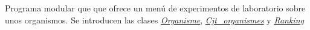 Programa modular que que ofrece un menú de experimentos de laboratorio sobre unos organismos. Se introducen las clases {\itshape  \hyperlink{class_organisme}{Organisme}}, {\itshape  \hyperlink{class_cjt__organismes}{Cjt\-\_\-organismes}} y {\itshape  \hyperlink{class_ranking}{Ranking}} 